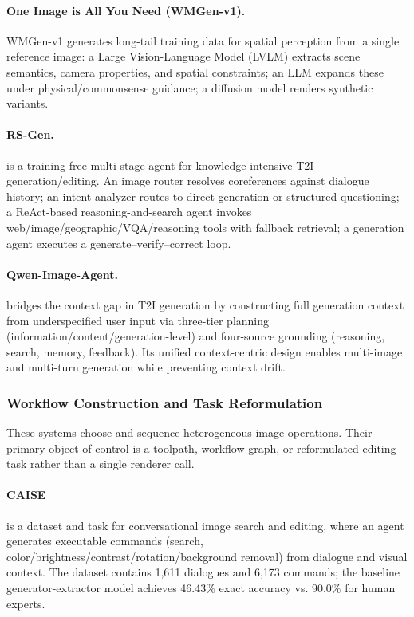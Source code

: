 \paragraph{One Image is All You Need (WMGen-v1).}
WMGen-v1 generates long-tail training data for spatial perception from a single reference image: a Large
Vision-Language Model (LVLM) extracts scene semantics, camera properties, and spatial constraints; an LLM expands these under physical/commonsense guidance; a diffusion model renders synthetic variants. ~\cite{avg260620764}

\paragraph{RS-Gen.}
 is a training-free multi-stage agent for knowledge-intensive T2I generation/editing. An image router resolves coreferences against dialogue history; an intent analyzer routes to direct generation or structured questioning; a ReAct-based reasoning-and-search agent invokes web/image/geographic/VQA/reasoning tools with fallback retrieval; a generation agent executes a generate–verify–correct loop. ~\cite{avg260623221}

\paragraph{Qwen-Image-Agent.}
 bridges the context gap in T2I generation by constructing full generation context from underspecified user input via three-tier planning (information/content/generation-level) and four-source grounding (reasoning, search, memory, feedback). Its unified context-centric design enables multi-image and multi-turn generation while preventing context drift.~\cite{avg260626907}

\subsubsection{Workflow Construction and Task Reformulation}
These systems choose and sequence heterogeneous image operations. Their primary object of control is a toolpath, workflow graph, or reformulated editing task rather than a single renderer call.

\paragraph{CAISE}
 is a dataset and task for conversational image search and editing, where an agent generates executable commands (search, color/brightness/contrast/rotation/background removal) from dialogue and visual context. The dataset contains 1,611 dialogues and 6,173 commands; the baseline generator-extractor model achieves 46.43\% exact accuracy vs. 90.0\% for human experts. ~\cite{kim2022caise}


